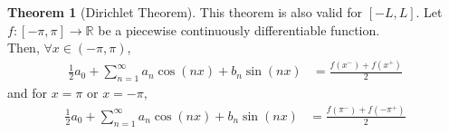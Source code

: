 \documentclass[fleqn, a4paper, 12pt, twoside]{article}
\theoremstyle{definition}
\theoremstyle{theorem}
\newtheorem{theorem}{Theorem}
\begin{document}
\begin{theorem}[Dirichlet Theorem]
	\marginnote
	{
		This theorem is also valid for $[-L,L]$.
	}
	Let $f : [-\pi,\pi] \to \mathbb{R}$ be a piecewise continuously differentiable function.\\
	Then, $\forall x \in (-\pi,\pi)$,
	\begin{align*}
		\frac{1}{2} a_0 + \sum\limits_{n = 1}^{\infty} a_n \cos(n x) + b_n \sin(n x) &= \frac{f(x^-) + f(x^+)}{2}
	\end{align*}
	and for $x = \pi$ or $x = -\pi$,
	\begin{align*}
		\frac{1}{2} a_0 + \sum\limits_{n = 1}^{\infty} a_n \cos(n x) + b_n \sin(n x) &= \frac{f(\pi^-) + f(-\pi^+)}{2}
	\end{align*}
	\label{Dirichlet_Theorem}
\end{theorem}
\end{document}
